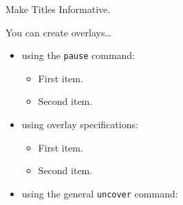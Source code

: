\begin{frame}{Make Titles Informative.}

  You can create overlays\dots
  \begin{itemize}
  \item using the \texttt{pause} command:
    \begin{itemize}
    \item
      First item.
      \pause
    \item    
      Second item.
    \end{itemize}
  \item
    using overlay specifications:
    \begin{itemize}
    \item<3->
      First item.
    \item<4->
      Second item.
    \end{itemize}
  \item
    using the general \texttt{uncover} command:
    \begin{itemize}
    \end{itemize}
  \end{itemize}
\end{frame}